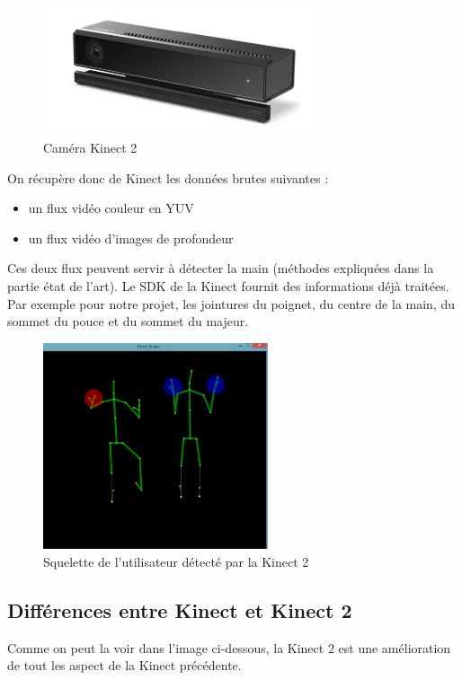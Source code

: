 \begin{figure}[H]
 \center
 \includegraphics[width=300px]{images/kinect-v2.png}
 \caption{Caméra Kinect 2}
\end{figure}

On récupère donc de Kinect les données brutes suivantes : 
\begin{itemize}
 \item un flux vidéo couleur en YUV
 \item un flux vidéo d'images de profondeur
\end{itemize}

Ces deux flux peuvent servir à détecter la main (méthodes expliquées dans la partie état de l'art).
Le SDK de la Kinect fournit des informations déjà traitées. 
Par exemple pour notre projet, les jointures du poignet, du centre de la main, du sommet du pouce et du sommet du majeur.

\begin{figure}[H]
\center
\includegraphics[width=250px]{images/kinec2_skel.png}
\caption{Squelette de l'utilisateur détecté par la Kinect 2}
\label{fig:skeleton_kinect2}
\end{figure}

\subsection{Différences entre Kinect et Kinect 2}

Comme on peut la voir dans l'image ci-dessous, la Kinect 2 est une amélioration de tout les aspect de la Kinect précédente.

